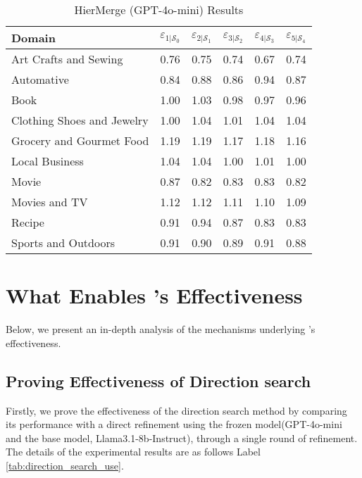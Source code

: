 \begin{table}[t]
    \centering
    \scriptsize
    \def\arraystretch{.99}
    \setlength{\tabcolsep}{0.42em}
    \begin{tabular}{lccccc}
      \toprule
      \textbf{Domain} & $\varepsilon_{1|\mathcal{S}_0}$ & $\varepsilon_{2|\mathcal{S}_1}$ & $\varepsilon_{3|\mathcal{S}_2}$ & $\varepsilon_{4|\mathcal{S}_3}$ & $\varepsilon_{5|\mathcal{S}_4}$ \\
      \midrule
      Art Crafts and Sewing     & 0.76 & 0.75 & 0.74 & 0.67 & 0.74 \\
      Automative                & 0.84 & 0.88 & 0.86 & 0.94 & 0.87 \\
      Book                      & 1.00 & 1.03 & 0.98 & 0.97 & 0.96 \\
      Clothing Shoes and Jewelry& 1.00 & 1.04 & 1.01 & 1.04 & 1.04 \\
      Grocery and Gourmet Food  & 1.19 & 1.19 & 1.17 & 1.18 & 1.16 \\
      Local Business            & 1.04 & 1.04 & 1.00 & 1.01 & 1.00 \\
      Movie                     & 0.87 & 0.82 & 0.83 & 0.83 & 0.82 \\
      Movies and TV             & 1.12 & 1.12 & 1.11 & 1.10 & 1.09 \\
      Recipe                    & 0.91 & 0.94 & 0.87 & 0.83 & 0.83 \\
      Sports and Outdoors       & 0.91 & 0.90 & 0.89 & 0.91 & 0.88 \\
      \bottomrule
    \end{tabular}
    \caption{HierMerge (GPT-4o-mini) Results}
    \label{tab:hiermerge_results}

  \end{table}
  



\clearpage
\section{What Enables \method's Effectiveness}
Below, we present an in-depth analysis of the mechanisms underlying \method’s effectiveness.

\subsection{Proving Effectiveness of Direction search}
Firstly, we prove the effectiveness of the direction search method by comparing its performance with a direct refinement using the frozen model(GPT-4o-mini and the base model, Llama3.1-8b-Instruct), through a single round of refinement. The details of the experimental results are as follows Label \ref{tab:direction_search_use}.


